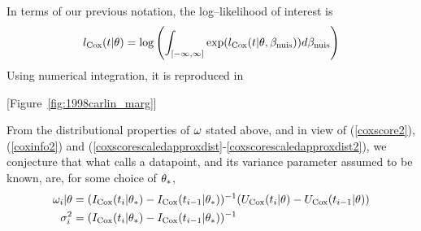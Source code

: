In terms of our previous notation, the log--likelihood of interest is
\begin{align}
l_{\mathrm{Cox}}(t|\theta)=\log\left(\int_{[-\infty,\infty]}\exp(l_{\mathrm{Cox}}(t|\theta,\beta_{\mathrm{nuis}}))d\beta_{\mathrm{nuis}}\right)
\end{align}Using numerical integration, it is reproduced in
\begin{center} [Figure~\ref{fig:1998carlin_marg}] \end{center}

From the distributional properties of $\omega$ stated above, and in view of (\ref{coxscore2}), (\ref{coxinfo2}) and (\ref{coxscorescaledapproxdist}-\ref{coxscorescaledapproxdist2}), we conjecture that what \cite{1998Carlin} calls a datapoint, and its variance parameter assumed to be known, are, for some choice of $\theta_*$,  \begin{align}\omega_{i}|\theta&=(I_{\mathrm{Cox}}(t_{i}|\theta_*)-I_{\mathrm{Cox}}(t_{i-1}|\theta_*))^{-1}(U_{\mathrm{Cox}}(t_{i}|\theta)-U_{\mathrm{Cox}}(t_{i-1}|\theta))\\
\sigma_i^2&=(I_{\mathrm{Cox}}(t_{i}|\theta_*)-I_{\mathrm{Cox}}(t_{i-1}|\theta_*))^{-1}
\end{align}

